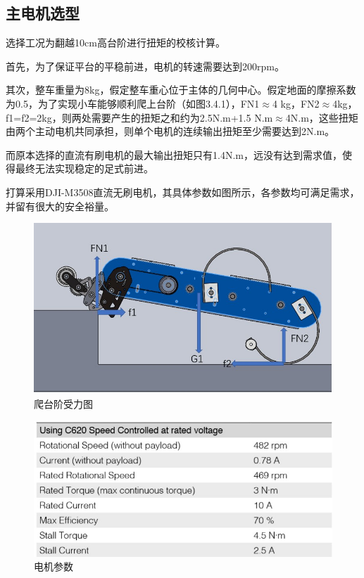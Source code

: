 \documentclass[12pt]{article}
\begin{document}
\begin{CJK}{UTF8}{gbsn}
\subsection{主电机选型}
选择工况为翻越10cm高台阶进行扭矩的校核计算。\par
首先，为了保证平台的平稳前进，电机的转速需要达到200rpm。\par
其次，整车重量为8kg，假定整车重心位于主体的几何中心。假定地面的摩擦系数为0.5，为了实现小车能够顺利爬上台阶（如图3.4.1），FN1$\approx$4 kg，FN2$\approx$4kg，f1=f2=2kg，则两处需要产生的扭矩之和约为2.5N.m+1.5 N.m$\approx$4N.m，这些扭矩由两个主动电机共同承担，则单个电机的连续输出扭矩至少需要达到2N.m。\par
而原本选择的直流有刷电机的最大输出扭矩只有1.4N.m，远没有达到需求值，使得最终无法实现稳定的足式前进。\par
打算采用DJI-M3508直流无刷电机，其具体参数如图所示，各参数均可满足需求，并留有很大的安全裕量。
 \begin{figure}[H]
\centering
\includegraphics[width=.8\textwidth]{chap3//fig6.jpg}
\caption{爬台阶受力图}
\end{figure}
 \begin{figure}[H]
\centering
\includegraphics[width=.8\textwidth]{chap3//fig7.jpg}
\caption{电机参数}
\end{figure}


\end{CJK}
\end{document}
